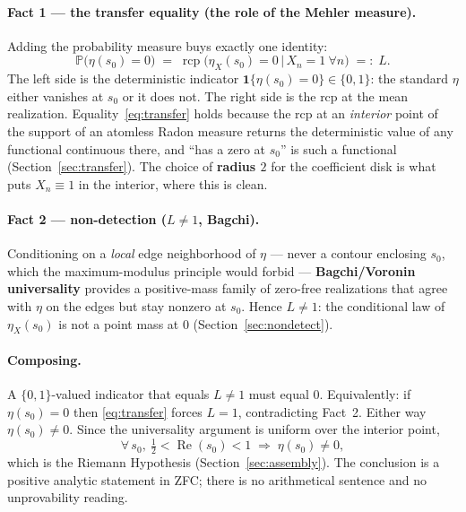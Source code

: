 \documentclass[11pt,a4paper]{article}
\theoremstyle{definition}
\newcommand{\Rea}{\operatorname{Re}}
\newcommand{\etaX}{\eta_X}
\newcommand{\rcp}{\operatorname{rcp}}
\begin{document}
\paragraph{Fact 1 --- the transfer equality (the role of the Mehler measure).} Adding the
probability measure buys exactly one identity:
\begin{equation}\label{eq:transfer}
  \mathbb{P}\bigl(\eta(s_0)=0\bigr)
  \;=\;
  \rcp\bigl(\etaX(s_0)=0 \,\big|\, X_n=1\ \forall n\bigr)
  \;=:\;L .
\end{equation}
The left side is the deterministic indicator \(\mathbf{1}\{\eta(s_0)=0\}\in\{0,1\}\): the
standard \(\eta\) either vanishes at \(s_0\) or it does not. The right side is the rcp at
the mean realization. Equality~\eqref{eq:transfer} holds because the rcp at an
\emph{interior} point of the support of an atomless Radon measure returns the
deterministic value of any functional continuous there, and ``has a zero at \(s_0\)'' is
such a functional (Section~\ref{sec:transfer}). The choice of \textbf{radius \(2\)} for
the coefficient disk is what puts \(X_n\equiv1\) in the interior, where this is clean.

\paragraph{Fact 2 --- non-detection (\(L\neq 1\), Bagchi).} Conditioning on a
\emph{local} edge neighborhood of \(\eta\) --- never a contour enclosing \(s_0\), which
the maximum-modulus principle would forbid --- \textbf{Bagchi/Voronin universality}
provides a positive-mass family of zero-free realizations that agree with \(\eta\) on the
edges but stay nonzero at \(s_0\). Hence \(L\neq 1\): the conditional law of \(\etaX(s_0)\)
is not a point mass at \(0\) (Section~\ref{sec:nondetect}).

\paragraph{Composing.} A \(\{0,1\}\)-valued indicator that equals \(L\neq 1\) must equal
\(0\). Equivalently: if \(\eta(s_0)=0\) then \eqref{eq:transfer} forces \(L=1\),
contradicting Fact~2. Either way \(\eta(s_0)\neq 0\). Since the universality argument is
uniform over the interior point,
\[
  \forall\,s_0,\ \tfrac12<\Rea(s_0)<1 \;\Longrightarrow\; \eta(s_0)\neq 0,
\]
which is the Riemann Hypothesis (Section~\ref{sec:assembly}). The conclusion is a positive
analytic statement in ZFC; there is no arithmetical sentence and no unprovability reading.
\end{document}
